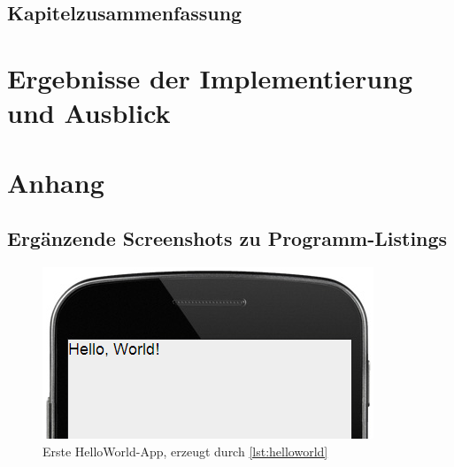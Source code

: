 \section{Kapitelzusammenfassung}

\chapter{Ergebnisse der Implementierung und Ausblick}


% 
%
\seAppendix{}
\chapter{Anhang}
\section*{Ergänzende Screenshots zu Programm-Listings}
\begin{figure}[H]
	\centering
	\includegraphics[width=.4\textwidth]{res/hello-world.png}
	\caption[Erste HelloWorld-App]{Erste HelloWorld-App, erzeugt durch \vref{lst:helloworld}\label{abb:helloworld}}
\end{figure}

%
%
%
%
\newpage
\sePrintGlossary{}


%
%
\sePrintBibliography{}

%


%
%


%
%
%

%
% 


%
%
%
\seEhrenwoertlicheErklaerung[\seThemaWaArbeit{}]


